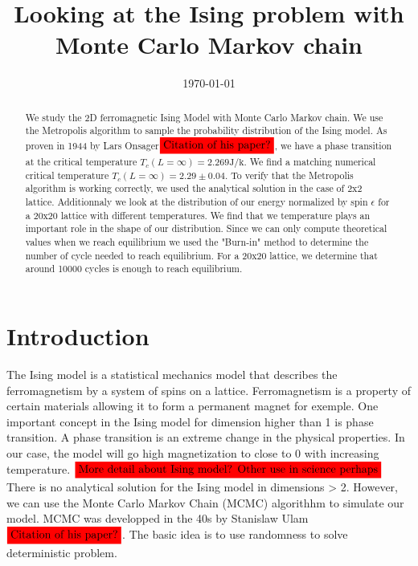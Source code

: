 \documentclass[english,notitlepage,reprint,nofootinbib]{revtex4-2}  %
\begin{document}
	
	\title{Looking at the Ising problem with Monte Carlo Markov chain}  %
	\author{} %
	\date{\today}                             %
	\noaffiliation                            %
	
	\begin{abstract}
	We study the 2D ferromagnetic Ising Model with Monte Carlo Markov chain. We use the Metropolis algorithm to sample the probability distribution of the Ising model.
	As proven in 1944 by Lars Onsager$\colorbox{red}{Citation of his paper?}$, we have a phase transition at the critical temperature $T_c(L=\infty)=2.269 \mathrm{J / k}$. We find a matching numerical 
	critical temperature $T_c(L=\infty) = 2.29 \pm 0.04$. To verify that the Metropolis algorithm is working correctly, we used the analytical solution in the case 
	of 2x2 lattice. Additionnaly we look at the distribution of our energy normalized by spin $\epsilon$ for a 20x20 lattice with different temperatures. We find that
	we temperature plays an important role in the shape of our distribution. Since we can only compute theoretical values when we reach equilibrium we used the "Burn-in" 
	method to determine the number of cycle needed to reach equilibrium. For a 20x20 lattice, we determine that around 10000 cycles is enough to reach equilibrium.
	  
	\end{abstract}
	\maketitle	
	
	
	\section{Introduction} \label{sec:introduction}
	The Ising model is a statistical mechanics model that describes the ferromagnetism by a system of spins on a lattice. 
	Ferromagnetism is a property of certain materials allowing it to form a permanent magnet for exemple. One important concept in the Ising model for dimension 
	higher than 1 is phase transition. A phase transition is an extreme change in the physical properties. In our case, the model will go high magnetization to close to 
	0 with increasing temperature. $\colorbox{red}{More detail about Ising model? Other use in science perhaps}$\\
	There is no analytical solution for the Ising model in dimensions > 2. However, we can use the Monte Carlo Markov Chain (MCMC) algorithhm to simulate our model. 
	MCMC was developped in the 40s by Stanislaw Ulam $\colorbox{red}{Citation of his paper?}$. The basic idea is to use randomness to solve deterministic problem. 
\end{document}
